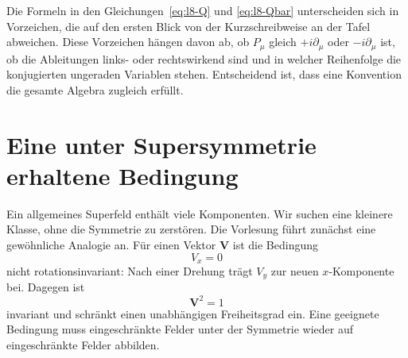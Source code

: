 \begin{classroomqa}
\end{classroomqa}

\begin{classroomqa}
\end{classroomqa}

Die Formeln in den Gleichungen~\eqref{eq:l8-Q} und \eqref{eq:l8-Qbar} unterscheiden sich in Vorzeichen, die auf den ersten Blick von der Kurzschreibweise an der Tafel abweichen. Diese Vorzeichen hängen davon ab, ob \(P_\mu\) gleich \(+i\partial_\mu\) oder \(-i\partial_\mu\) ist, ob die Ableitungen links- oder rechtswirkend sind und in welcher Reihenfolge die konjugierten ungeraden Variablen stehen. Entscheidend ist, dass eine Konvention die gesamte Algebra zugleich erfüllt.

\section{Eine unter Supersymmetrie erhaltene Bedingung}

Ein allgemeines Superfeld enthält viele Komponenten. Wir suchen eine kleinere Klasse, ohne die Symmetrie zu zerstören. Die Vorlesung führt zunächst eine gewöhnliche Analogie an. Für einen Vektor \(\mathbf V\) ist die Bedingung
\begin{equation}
V_x=0
\end{equation}
nicht rotationsinvariant: Nach einer Drehung trägt \(V_y\) zur neuen \(x\)-Komponente bei. Dagegen ist
\begin{equation}
\mathbf V^2=1
\end{equation}
invariant und schränkt einen unabhängigen Freiheitsgrad ein. Eine geeignete Bedingung muss eingeschränkte Felder unter der Symmetrie wieder auf eingeschränkte Felder abbilden.

